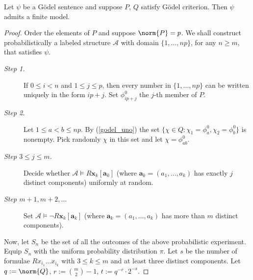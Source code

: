 \begin{thm} Let $\psi$ be a G\"odel sentence and suppose $P$, $Q$ satisfy G\"odel criterion. 
Then $\psi$ admits a finite model.  
\begin{proof} Order the elements of $P$ and suppose $\norm{P}=p$. 
We shall construct probabilistically a labeled structure $\mathcal{A}$ with domain $\{1, \ldots, np\}$, for any $n \ge m$, that satisfies $\psi$. 
\begin{description}
\item[\emph{Step 1.}] If $0 \le i <n$ and $1 \le j \le p$, then every number in $\{1, \ldots, np\}$ can be written uniquely in the form $ip+j$. 
Set $\phi^0 _{ip+j}$ the $j$-th member of $P$. 
\item[\emph{Step 2.}] Let $1 \le a < b \le np$. By (\ref{godel_uno}) the set $\{ \chi \in Q : \chi_1=\phi^0 _a , \chi_2 =\phi^0 _b\}$ is nonempty. 
Pick randomly $\chi$ in this set and let $\chi=\phi^0 _{ab}$. 
\item[\emph{Step $3\le j \le m$.}] Decide whether $\mathcal{A} \models R\mathbf{x}_k [\mathbf{a}_k]$ (where $\mathbf{a}_k=(a_1, \ldots, a_k)$ has exactly $j$ distinct components) uniformly at random.  
\item[\emph{Step $m+1, m+2, \ldots$}] Set $\mathcal{A} \models \lnot R \mathbf{x}_k [\mathbf{a}_k] $ (where $\mathbf{a}_k=(a_1, \ldots, a_k)$ has more than $m$ distinct components). 
\end{description}
Now, let $S_n$ be the set of all the outcomes of the above probabilistic experiment. 
Equip $S_n$ with the uniform probability distribution $\pi$. 
Let $s$ be the number of formulae $Rx_{i_1}\ldots x_{i_k}$ with $3 \le k \le m$ and at least three distinct components.
Let $q:=\norm{Q}$, $r:=\binom{m}{2}-1$, $t:=q^{-r} \cdot 2^{-s}$. 


\end{proof}
\end{thm}

